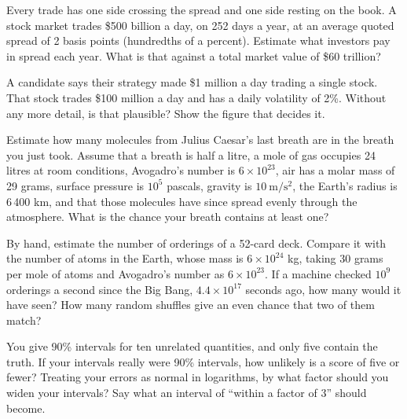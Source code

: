 \begin{question}\label{iq:iv1:estimation:17}
Every trade has one side crossing the spread and one side resting on the book. A stock market trades \$500 billion a day, on 252 days a year, at an average quoted spread of 2 basis points (hundredths of a percent). Estimate what investors pay in spread each year. What is that against a total market value of \$60 trillion?
\end{question}

\begin{question}\label{iq:iv1:estimation:18}
A candidate says their strategy made \$1 million a day trading a single stock. That stock trades \$100 million a day and has a daily volatility of 2\%. Without any more detail, is that plausible? Show the figure that decides it.
\end{question}

\begin{question}\label{iq:iv1:estimation:19}
Estimate how many molecules from Julius Caesar's last breath are in the breath you just took. Assume that a breath is half a litre, a mole of gas occupies 24 litres at room conditions, Avogadro's number is $6 \times 10^{23}$, air has a molar mass of 29 grams, surface pressure is $10^5$ pascals, gravity is $10\ \mathrm{m/s^2}$, the Earth's radius is 6\,400 km, and that those molecules have since spread evenly through the atmosphere. What is the chance your breath contains at least one?
\end{question}

\begin{question}\label{iq:iv1:estimation:20}
By hand, estimate the number of orderings of a 52-card deck. Compare it with the number of atoms in the Earth, whose mass is $6 \times 10^{24}$ kg, taking 30 grams per mole of atoms and Avogadro's number as $6 \times 10^{23}$. If a machine checked $10^9$ orderings a second since the Big Bang, $4.4 \times 10^{17}$ seconds ago, how many would it have seen? How many random shuffles give an even chance that two of them match?
\end{question}

\begin{question}\label{iq:iv1:estimation:21}
You give 90\% intervals for ten unrelated quantities, and only five contain the truth. If your intervals really were 90\% intervals, how unlikely is a score of five or fewer? Treating your errors as normal in logarithms, by what factor should you widen your intervals? Say what an interval of ``within a factor of 3'' should become.
\end{question}

